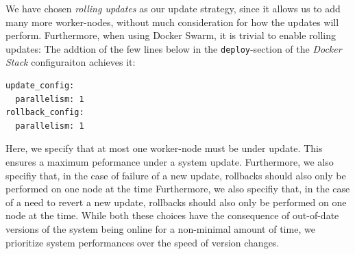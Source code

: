 We have chosen \textit{rolling updates} as our update strategy, since it allows us to add many more worker-nodes, without much consideration for how the updates will perform.
Furthermore, when using Docker Swarm, it is trivial to enable rolling updates: The addtion of the few lines below in the \texttt{deploy}-section of the \textit{Docker Stack} configuraiton achieves it:

\begin{lstlisting}
update_config:
  parallelism: 1
rollback_config:
  parallelism: 1
\end{lstlisting}

Here, we specify that at most one worker-node must be under update. This ensures a maximum peformance under a system update.
Furthermore, we also specifiy that, in the case of failure of a new update, rollbacks should also only be performed on one node at the time
Furthermore, we also specifiy that, in the case of a need to revert a new update, rollbacks should also only be performed on one node at the time.
While both these choices have the consequence of out-of-date versions of the system being online for a non-minimal amount of time, we prioritize system performances over the speed of version changes.







